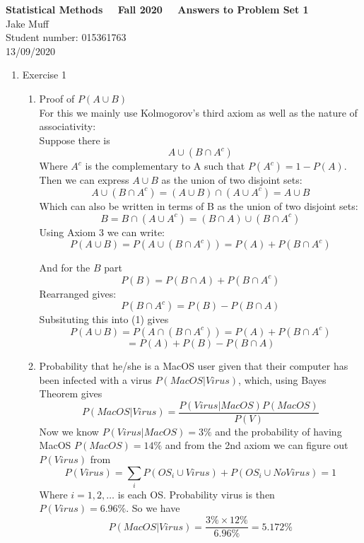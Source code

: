 \documentclass[12pt]{article}
\begin{document}
\normalsize

\baselineskip 14pt

\begin{center}
{\Large {\bf Statistical Methods \ \ Fall 2020 \ \  Answers to Problem Set 1}}\\
{\large { Jake Muff}}\\
{Student number: 015361763}\\
{13/09/2020}
\end{center}



\begin{enumerate}

\item Exercise 1
\begin{enumerate}
    \item Proof of $P(A \cup B)$
    \\ 
    For this we mainly use Kolmogorov's third axiom as well as the nature of associativity:
    \\
    Suppose there is 
    $$ A \cup (B \cap A^c) $$
    Where $A^c$ is the complementary to A such that $P(A^c) = 1-P(A) $. Then we can express $ A \cup B$ as the union of two disjoint sets:
    $$ A \cup (B \cap A^c) = (A \cup B) \cap (A \cup A^c) = A\cup B $$
    Which can also be written in terms of B as the union of two disjoint sets:
    $$ B = B \cap (A \cup A^c) = (B \cap A) \cup (B\cap A^c) $$
    Using Axiom 3 we can write:
    \begin{equation} \label{1}
        P(A\cup B) = P(A \cup (B \cap A^c)) = P(A) + P(B \cap A^c) 
    \end{equation}
    
    And for the $B$ part
    $$ P(B) = P(B \cap A) + P(B\cap A^c) $$ 
    Rearranged gives:
    $$ P(B \cap A^c) = P(B) - P(B \cap A)  $$
    Subsituting this into (1) gives 
    $$ P(A \cup B) = P(A \cap (B \cap A^c)) = P(A) + P(B \cap A^c) $$
    $$ = P(A) + P(B) - P(B \cap A) $$


    \item Probability that he/she is a MacOS user given that their computer has been infected with a virus $P(MacOS|Virus)$, which, using Bayes Theorem gives
    $$ P(MacOS|Virus) = \frac{P(Virus|MacOS) P(MacOS)}{P(V)} $$
    Now we know $P(Virus | MacOS) = 3\%$ and the probability of having MacOS $P(MacOS) = 14\%$ and from the 2nd axiom we can figure out $P(Virus)$ from
    $$ P(Virus) = \sum_i P(OS_i \cup Virus) + P(OS_i \cup No Virus) = 1 $$ 
    Where $i = 1,2, \ldots$ is each OS. Probability virus is then $P(Virus) = 6.96\%$. So we have 
    $$ P(MacOS|Virus) = \frac{3\% \times 12\%}{6.96\%} = 5.172\% $$


\end{enumerate}
\end{enumerate}
\end{document}
